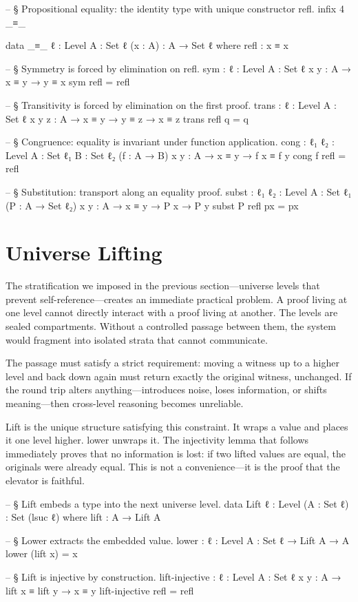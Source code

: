 \documentclass[11pt,a4paper]{book}
\def\texttt#1{#1}%
\begin{document}
\begin{code}
-- § Propositional equality: the identity type with unique constructor refl.
infix 4 _≡_

data _≡_ {ℓ : Level} {A : Set ℓ} (x : A) : A → Set ℓ where
  refl : x ≡ x

-- § Symmetry is forced by elimination on refl.
sym : {ℓ : Level} {A : Set ℓ} {x y : A} → x ≡ y → y ≡ x
sym refl = refl

-- § Transitivity is forced by elimination on the first proof.
trans : {ℓ : Level} {A : Set ℓ} {x y z : A} → x ≡ y → y ≡ z → x ≡ z
trans refl q = q

-- § Congruence: equality is invariant under function application.
cong : {ℓ₁ ℓ₂ : Level} {A : Set ℓ₁} {B : Set ℓ₂} (f : A → B) {x y : A} → x ≡ y → f x ≡ f y
cong f refl = refl

-- § Substitution: transport along an equality proof.
subst : {ℓ₁ ℓ₂ : Level} {A : Set ℓ₁} (P : A → Set ℓ₂) {x y : A} → x ≡ y → P x → P y
subst P refl px = px
\end{code}

\section{Universe Lifting}

The stratification we imposed in the previous section—universe levels that prevent self-reference—creates an immediate practical problem. A proof living at one level cannot directly interact with a proof living at another. The levels are sealed compartments. Without a controlled passage between them, the system would fragment into isolated strata that cannot communicate.

The passage must satisfy a strict requirement: moving a witness up to a higher level and back down again must return exactly the original witness, unchanged. If the round trip alters anything—introduces noise, loses information, or shifts meaning—then cross-level reasoning becomes unreliable.

\texttt{Lift} is the unique structure satisfying this constraint. It wraps a value and places it one level higher. \texttt{lower} unwraps it. The injectivity lemma that follows immediately proves that no information is lost: if two lifted values are equal, the originals were already equal. This is not a convenience—it is the proof that the elevator is faithful.

\begin{code}
-- § Lift embeds a type into the next universe level.
data Lift {ℓ : Level} (A : Set ℓ) : Set (lsuc ℓ) where
  lift : A → Lift A

-- § Lower extracts the embedded value.
lower : {ℓ : Level} {A : Set ℓ} → Lift A → A
lower (lift x) = x

-- § Lift is injective by construction.
lift-injective : {ℓ : Level} {A : Set ℓ} {x y : A} → lift x ≡ lift y → x ≡ y
lift-injective refl = refl
\end{code}
\end{document}
